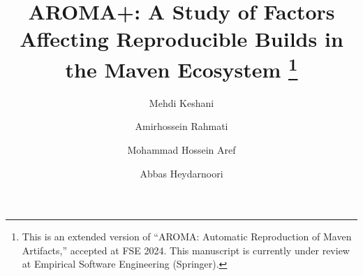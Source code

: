 \documentclass[smallextended]{svjour3}
\begin{document}
\title{AROMA+: A Study of Factors Affecting Reproducible Builds in the Maven Ecosystem
\thanks{This is an extended version of ``AROMA: Automatic Reproduction of Maven Artifacts,'' accepted at FSE 2024. This manuscript is currently under review at Empirical Software Engineering (Springer).}
}
\subtitle{}


\author{Mehdi Keshani        \and
        Amirhossein Rahmati  \and
        Mohammad Hossein Aref \and
        Abbas Heydarnoori
}



\renewcommand{\makeheadbox}{}
\date{}
    \maketitle
\end{document}
